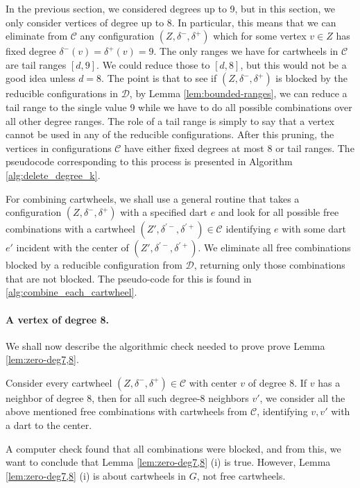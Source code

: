 \documentclass[10pt,a4paper]{article}
\def\cD{{\mathcal D}}
\def\cC{{\mathcal C}}
\begin{document}
In the previous section, we considered degrees up to 9, but in this section, we only consider vertices of degree up to 8. In particular, this means that we can eliminate from $\cC$ any configuration $(Z,\delta^-,\delta^+)$
which for some vertex $v\in Z$ has fixed degree
$\delta^-(v)=\delta^+(v)=9$. The only ranges we
have for cartwheels in $\cC$ are tail ranges $[d,9]$. We could reduce those to $[d,8]$, but this would not be a good idea unless $d=8$. The point is that to see if
$(Z,\delta^-,\delta^+)$ is blocked by the reducible configurations in $\cD$, by Lemma \ref{lem:bounded-ranges}, we can reduce a tail range to the single value 9 while we have to do all possible combinations over all other degree ranges. The role of a tail range is simply to say that a vertex cannot be used in any of the reducible configurations.
After this pruning, the vertices in configurations $\cC$ 
have either fixed degrees at most 8 or tail ranges.
The pseudocode corresponding to this process is presented in Algorithm \ref{alg:delete_degree_k}.

For combining cartwheels, we shall use a general routine that takes a configuration $(Z,\delta^-,\delta^+)$ with a specified dart $e$
and look for all possible 
free combinations with 
a cartwheel $(Z',\delta^{\prime -},\delta^{\prime+})\in \cC$ identifying $e$ with some dart $e'$ incident with the center of $(Z',\delta^{\prime -},\delta^{\prime+})$.
We eliminate all free combinations blocked by a reducible configuration from $\cD$, returning only those combinations that are not blocked.
The pseudo-code for this is found in \ref{alg:combine_each_cartwheel}.

\paragraph{A vertex of degree 8.} 
We shall now describe the algorithmic check needed to prove 
prove Lemma \ref{lem:zero-deg7,8}.

Consider every cartwheel
$(Z,\delta^-,\delta^+)\in \cC$ with center $v$ of degree 8. If $v$ has a neighbor of degree 8, 
then for all such degree-8 neighbors $v'$, we consider all the above mentioned free combinations with cartwheels from $\cC$, identifying $v,v'$ with a dart to the center.

A computer check found that all combinations were blocked, and from this, we want to conclude that Lemma \ref{lem:zero-deg7,8} (i) is true. However, Lemma \ref{lem:zero-deg7,8} (i) is about cartwheels in 
$G$, not free cartwheels.
\end{document}
